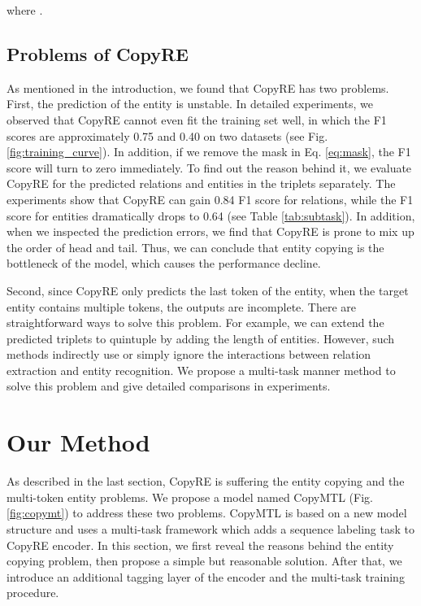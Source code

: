 \documentclass[letterpaper]{article} \usepackage{aaai20}  \usepackage{times}  \usepackage{helvet} \usepackage{courier}  \usepackage[hyphens]{url}  \usepackage{graphicx}
\begin{document}
      where .
  


      \subsection{Problems of CopyRE}
      \label{sec:problem}
      
As mentioned in the introduction, we found that CopyRE has two problems.    
      First, the prediction of the entity is unstable. 
      In detailed experiments, we observed that CopyRE cannot even fit the training set well, in which the F1 scores are approximately {0.75} and {0.40} on two datasets (see Fig. \ref{fig:training_curve}). 
      In addition, if we remove the mask  in Eq. \eqref{eq:mask}, the F1 score will turn to zero immediately. 
      To find out the reason behind it, we evaluate CopyRE for the predicted relations and entities in the triplets separately.
      The experiments show that CopyRE can gain {0.84} F1 score for relations, while the F1 score for entities dramatically drops to {0.64} (see Table \ref{tab:subtask}). 
      In addition, when we inspected the prediction errors, we find that CopyRE is prone to mix up the order of head and tail.
      Thus, we can conclude that entity copying is the bottleneck of the model, which causes the performance decline.


      Second, since CopyRE only predicts the last token of the entity, when the target entity contains multiple tokens, the outputs are incomplete. 
      There are straightforward ways to solve this problem. 
      For example, we can extend the predicted triplets to quintuple by adding the length of entities.
      However, such methods indirectly use or simply ignore the interactions between relation extraction and entity recognition. 
      We propose a multi-task manner method to solve this problem and give detailed comparisons in experiments.


  
  \section{Our Method}
  

  As described in the last section, CopyRE is suffering the entity copying and the multi-token entity problems. 
  We propose a model named CopyMTL (Fig. \ref{fig:copymt}) to address these two problems.
  CopyMTL is based on a new model structure and uses a multi-task framework which adds a sequence labeling task to CopyRE encoder.
  In this section, we first reveal the reasons behind the entity copying problem, then propose a simple but reasonable solution.
  After that, we introduce an additional tagging layer of the encoder and the multi-task training procedure.
  
\end{document}
